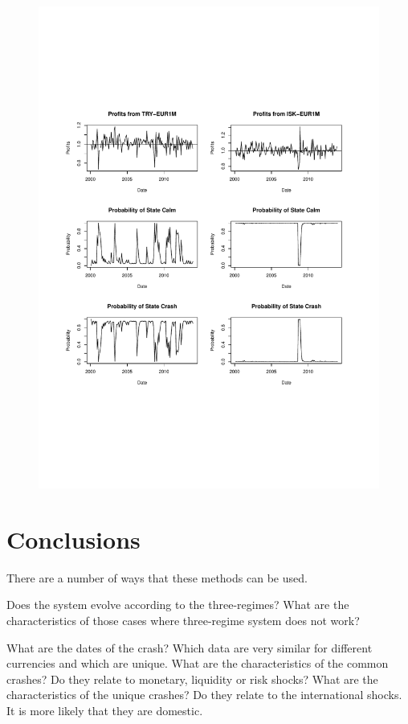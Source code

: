 \documentclass[12pt, a4paper, oneside]{article} %
\begin{document}
\begin{figure}[h!]
\centering
\includegraphics[scale = .80]{../Figures/2RegProb/ISKTRYEUR.pdf}
\end{figure}


\section{Conclusions}
There are a number of ways that these methods can be used. 

Does the system evolve according to the three-regimes?  What are the characteristics of those cases where three-regime system does not work?  

What are the dates of the crash?  Which data are very similar for different currencies and which are unique.  What are the characteristics of the common crashes?  Do they relate to monetary, liquidity or risk shocks?  What are the characteristics of the unique crashes?  Do they relate to the international shocks.  It is more likely that they are domestic. 
\end{document}
